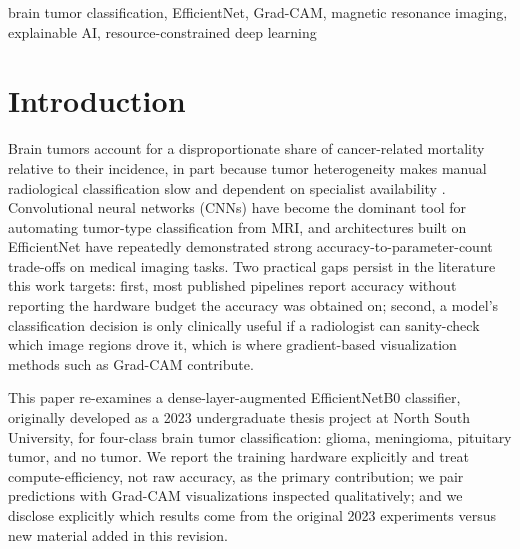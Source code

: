 \documentclass[journal]{IEEEtran}
\begin{document}
\begin{abstract}
\begin{CJK}{UTF8}{bkai}
從磁振造影（MRI）準確分類腦腫瘤亞型有助於加速診斷流程，但許多高準確率的深度學習模型假設臨床資源受限環境中未必具備的運算資源，且鮮少將預測結果與可供放射科醫師檢視的區域級解釋相結合。本研究重新檢視一個以密集層強化之 EfficientNetB0 架構，應用於四類腦腫瘤分類任務，使用 3,260 張 T1 加權對比增強 MRI 影像，並於單一消費級 GPU（NVIDIA GTX 1050、8GB）上訓練，同時搭配 Grad-CAM 活化映射以提供預測層級的可解釋性。密集 EfficientNet 達到 99.97\% 訓練準確率，並在 326 張保留測試影像中正確分類 322 張（測試準確率 98.77\%），相對於 ResNet-50 基準的 314/326（96.32\%）——惟此為方向性比較，非統計顯著性結果。就可測量的資源效率指標而言，密集 EfficientNet 估計使用約 667 萬個可訓練參數，相較 ResNet-50 的 2,353 萬個，約減少 3.5 倍。
\end{CJK}
\end{abstract}

\begin{IEEEkeywords}
brain tumor classification, EfficientNet, Grad-CAM, magnetic resonance imaging, explainable AI, resource-constrained deep learning
\end{IEEEkeywords}

\section{Introduction}

Brain tumors account for a disproportionate share of cancer-related mortality relative to their incidence, in part because tumor heterogeneity makes manual radiological classification slow and dependent on specialist availability \cite{ref1,ref2}. Convolutional neural networks (CNNs) have become the dominant tool for automating tumor-type classification from MRI, and architectures built on EfficientNet \cite{ref3} have repeatedly demonstrated strong accuracy-to-parameter-count trade-offs on medical imaging tasks. Two practical gaps persist in the literature this work targets: first, most published pipelines report accuracy without reporting the hardware budget the accuracy was obtained on; second, a model's classification decision is only clinically useful if a radiologist can sanity-check which image regions drove it, which is where gradient-based visualization methods such as Grad-CAM \cite{ref4} contribute.

This paper re-examines a dense-layer-augmented EfficientNetB0 classifier, originally developed as a 2023 undergraduate thesis project at North South University, for four-class brain tumor classification: glioma, meningioma, pituitary tumor, and no tumor. We report the training hardware explicitly and treat compute-efficiency, not raw accuracy, as the primary contribution; we pair predictions with Grad-CAM visualizations inspected qualitatively; and we disclose explicitly which results come from the original 2023 experiments versus new material added in this revision.
\end{document}
